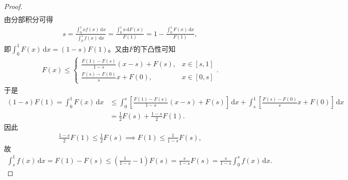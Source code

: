 \documentclass[../../main.tex]{subfiles}
\begin{document}
\begin{proof}
\begin{align*}
\end{align*}
由分部积分可得
\begin{align*}
s = \frac{\int_0^1 x f(x) \, \mathrm{d}x}{\int_0^1 f(x) \, \mathrm{d}x} = \frac{\int_0^1 x \, \mathrm{d}F(x)}{F(1)} = 1 - \frac{\int_0^1 F(x) \, \mathrm{d}x}{F(1)},
\end{align*}
即$\int_0^1 F(x) \, \mathrm{d}x = (1 - s) F(1)$。又由$F$的下凸性可知
\begin{align*}
F(x) \leqslant  
\begin{cases}
\frac{F(1) - F(s)}{1 - s}(x - s) + F(s), & x \in [s,1] \\
\frac{F(s) - F(0)}{s}x + F(0), & x \in [0,s]
\end{cases}.
\end{align*}
于是
\begin{align*}
(1 - s) F(1) = \int_0^1 F(x) \, \mathrm{d}x &\leqslant  \int_0^s \left[ \frac{F(1) - F(s)}{1 - s}(x - s) + F(s) \right] \, \mathrm{d}x + \int_s^1 \left[ \frac{F(s) - F(0)}{s}x + F(0) \right] \, \mathrm{d}x \\
&= \frac{1}{2} F(s) + \frac{1 - s}{2} F(1).
\end{align*}
因此
\begin{align*}
\frac{1 - s}{2} F(1) \leqslant  \frac{1}{2} F(s) \implies F(1) \leqslant  \frac{1}{1 - s} F(s),
\end{align*}
故
\begin{align*}
\int_s^1 f(x) \, \mathrm{d}x = F(1) - F(s) \leqslant  \left( \frac{1}{1 - s} - 1 \right) F(s) = \frac{s}{1 - s} F(s) = \frac{s}{1 - s} \int_0^s f(x) \, \mathrm{d}x.
\end{align*}

\end{proof}
\end{document}
